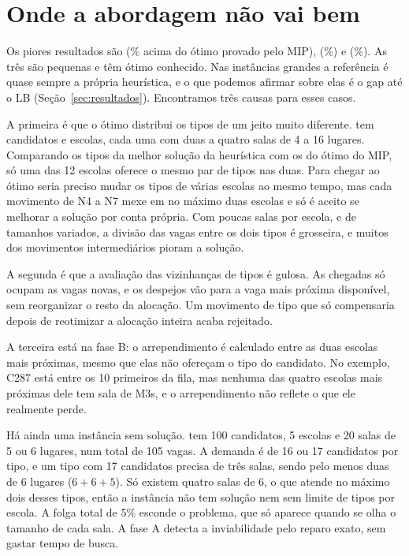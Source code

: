 \documentclass[12pt]{article}
\begin{document}
\section{Onde a abordagem não vai bem}\label{sec:ruim}

Os piores resultados são \piorUmId{} (\piorUmGap\% acima do ótimo provado pelo MIP), \piorDoisId{}
(\piorDoisGap\%) e \piorTresId{} (\piorTresGap\%). As três são pequenas e têm ótimo conhecido. Nas
instâncias grandes a referência é quase sempre a própria heurística, e o que podemos afirmar sobre
elas é o gap até o LB (Seção~\ref{sec:resultados}). Encontramos três causas para esses casos.

A primeira é que o ótimo distribui os tipos de um jeito muito diferente. \piorUmId{} tem
\piorUmM{} candidatos e \piorUmN{} escolas, cada uma com duas a quatro salas de 4 a 16 lugares.
Comparando os tipos da melhor solução da heurística com os do ótimo do MIP, só uma das 12 escolas
oferece o mesmo par de tipos nas duas. Para chegar ao ótimo seria preciso mudar os tipos de várias
escolas ao mesmo tempo, mas cada movimento de N4 a N7 mexe em no máximo duas escolas e só é aceito
se melhorar a solução por conta própria. Com poucas salas por escola, e de tamanhos variados, a
divisão das vagas entre os dois tipos é grosseira, e muitos dos movimentos intermediários pioram a
solução.

A segunda é que a avaliação das vizinhanças de tipos é gulosa. As chegadas só ocupam as vagas
novas, e os despejos vão para a vaga mais próxima disponível, sem reorganizar o resto da alocação.
Um movimento de tipo que só compensaria depois de reotimizar a alocação inteira acaba rejeitado.

A terceira está na fase B: o arrependimento é calculado entre as duas escolas mais próximas, mesmo
que elas não ofereçam o tipo do candidato. No exemplo, C287 está entre os 10 primeiros da fila,
mas nenhuma das quatro escolas mais próximas dele tem sala de M3s, e o arrependimento não reflete
o que ele realmente perde.

Há ainda uma instância sem solução. \idInviavel{} tem 100 candidatos, 5 escolas e 20 salas de 5
ou 6 lugares, num total de 105 vagas. A demanda é de 16 ou 17 candidatos por tipo, e um tipo com
17 candidatos precisa de três salas, sendo pelo menos duas de 6 lugares ($6+6+5$). Só existem
quatro salas de 6, o que atende no máximo dois desses tipos, então a instância não tem solução nem
sem limite de tipos por escola. A folga total de 5\% esconde o problema, que só aparece quando se
olha o tamanho de cada sala. A fase A detecta a inviabilidade pelo reparo exato, sem gastar tempo
de busca.
\end{document}
